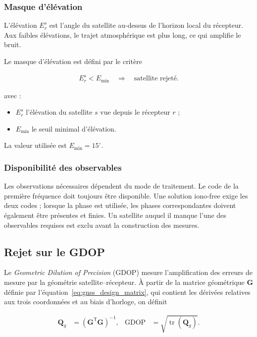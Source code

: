 \subsubsection{Masque d'élévation}

L'élévation $E_r^s$ est l'angle du satellite au-dessus de l'horizon local du
récepteur. Aux faibles élévations, le trajet atmosphérique est plus long, ce qui amplifie le bruit.

Le masque d'élévation est défini par le critère

\begin{align}
E_r^s < E_{\min}
\quad\Longrightarrow\quad
\text{satellite rejeté}.
\label{eq:elevation_mask}
\end{align}

avec :

\begin{itemize}
    \item $E_r^s$ l'élévation du satellite $s$ vue depuis le récepteur $r$ ;
    \item $E_{\min}$ le seuil minimal d'élévation.
\end{itemize}

La valeur utilisée est $E_{\min}=15^\circ$.

\subsubsection{Disponibilité des observables}

Les observations nécessaires dépendent du mode de traitement. Le code de la
première fréquence doit toujours être disponible. Une solution
iono-free exige les deux codes ; lorsque la phase est utilisée, les
phases correspondantes doivent également être présentes et finies. Un
satellite auquel il manque l'une des observables requises est exclu avant la
construction des mesures.

\subsection{Rejet sur le GDOP}

Le \textit{Geometric Dilution of Precision} (GDOP) mesure l'amplification des
erreurs de mesure par la géométrie satellite--récepteur. À partir de la matrice
géométrique $\mathbf G$ définie par l'équation~\eqref{eq:gnss_design_matrix},
qui contient les dérivées relatives aux trois coordonnées et au biais
d'horloge, on définit

\begin{align}
\mathbf Q_g
&=
\left(\mathbf G^{\mathsf T}\mathbf G\right)^{-1},
&
\mathrm{GDOP}
&=
\sqrt{\operatorname{tr}\left(\mathbf Q_g\right)}.
\label{eq:gdop_definition}
\end{align}

